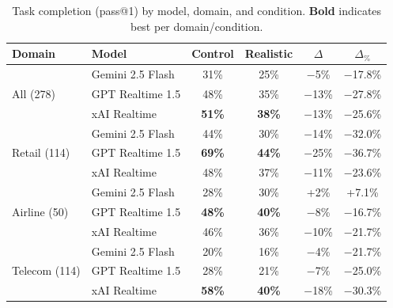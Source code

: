 \begin{table}[h]
\caption{Task completion (pass@1) by model, domain, and condition. \textbf{Bold} indicates best per domain/condition.}
\label{tab:main-results}
\centering
\begin{small}
\begin{tabular}{llcccc}
\toprule
\textbf{Domain} & \textbf{Model} & \textbf{Control} & \textbf{Realistic} & \textbf{$\Delta$} & \textbf{$\Delta_{\%}$} \\
\midrule
\multirow{3}{*}{All (278)} & Gemini 2.5 Flash & 31\% & 25\% & $-$5\% & $-$17.8\% \\
 & GPT Realtime 1.5 & 48\% & 35\% & $-$13\% & $-$27.8\% \\
 & xAI Realtime & \textbf{51\%} & \textbf{38\%} & $-$13\% & $-$25.6\% \\
\midrule
\multirow{3}{*}{Retail (114)} & Gemini 2.5 Flash & 44\% & 30\% & $-$14\% & $-$32.0\% \\
 & GPT Realtime 1.5 & \textbf{69\%} & \textbf{44\%} & $-$25\% & $-$36.7\% \\
 & xAI Realtime & 48\% & 37\% & $-$11\% & $-$23.6\% \\
\midrule
\multirow{3}{*}{Airline (50)} & Gemini 2.5 Flash & 28\% & 30\% & +2\% & +7.1\% \\
 & GPT Realtime 1.5 & \textbf{48\%} & \textbf{40\%} & $-$8\% & $-$16.7\% \\
 & xAI Realtime & 46\% & 36\% & $-$10\% & $-$21.7\% \\
\midrule
\multirow{3}{*}{Telecom (114)} & Gemini 2.5 Flash & 20\% & 16\% & $-$4\% & $-$21.7\% \\
 & GPT Realtime 1.5 & 28\% & 21\% & $-$7\% & $-$25.0\% \\
 & xAI Realtime & \textbf{58\%} & \textbf{40\%} & $-$18\% & $-$30.3\% \\
\bottomrule
\end{tabular}
\end{small}
\end{table}